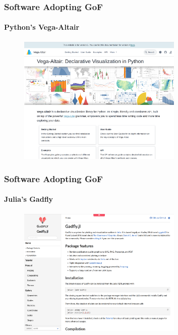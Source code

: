 \documentclass[aspectratio=1610]{beamer}
\begin{document}
\begin{frame}
	\frametitle{Software Adopting GoF}
	\framesubtitle{Python's Vega-Altair}
	\begin{figure}
		\begin{center}
			\includegraphics[width=0.7\textwidth]{figures/altair.png}
		\end{center}
	\end{figure}
\end{frame}

\begin{frame}
	\frametitle{Software Adopting GoF}
	\framesubtitle{Julia's Gadfly}
	\begin{figure}
		\begin{center}
			\includegraphics[width=0.7\textwidth]{figures/gadfly}
		\end{center}
	\end{figure}
\end{frame}
\end{document}
